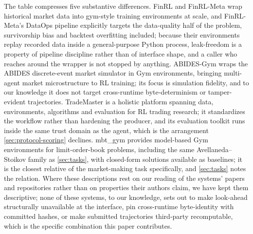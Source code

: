The table compresses five substantive differences. FinRL and FinRL-Meta wrap historical market data into gym-style training environments at scale, and FinRL-Meta's DataOps pipeline explicitly targets the data-quality half of the problem, survivorship bias and backtest overfitting included; because their environments replay recorded data inside a general-purpose Python process, leak-freedom is a property of pipeline discipline rather than of interface shape, and a caller who reaches around the wrapper is not stopped by anything. ABIDES-Gym wraps the ABIDES discrete-event market simulator in Gym environments, bringing multi-agent market microstructure to RL training; its focus is simulation fidelity, and to our knowledge it does not target cross-runtime byte-determinism or tamper-evident trajectories. TradeMaster is a holistic platform spanning data, environments, algorithms and evaluation for RL trading research; it standardizes the workflow rather than hardening the producer, and its evaluation toolkit runs inside the same trust domain as the agent, which is the arrangement \cref{sec:protocol-scoring} declines. mbt\_gym provides model-based Gym environments for limit-order-book problems, including the same Avellaneda--Stoikov family as \cref{sec:tasks}, with closed-form solutions available as baselines; it is the closest relative of the market-making task specifically, and \cref{sec:tasks} notes the relation. Where these descriptions rest on our reading of the systems' papers and repositories rather than on properties their authors claim, we have kept them descriptive; none of these systems, to our knowledge, sets out to make look-ahead structurally unavailable at the interface, pin cross-runtime byte-identity with committed hashes, or make submitted trajectories third-party recomputable, which is the specific combination this paper contributes.

